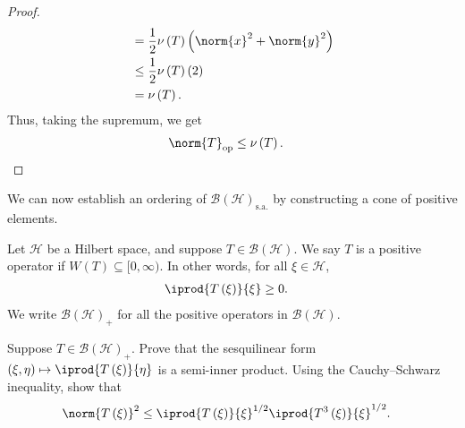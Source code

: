 \documentclass[10pt]{mypackage}
\newcommand{\sa}{\text{s.a.}}
\begin{document}
\begin{proof}
\begin{align*}
                                                      &= \frac{1}{2}\nu\left(T\right)\left(\norm{x}^2 + \norm{y}^2\right)\\
                                                      &\leq \frac{1}{2}\nu\left(T\right)\left(2\right)\\
                                                      &= \nu\left(T\right).
  \end{align*}
  Thus, taking the supremum, we get
  \begin{align*}
    \norm{T}_{\text{op}} &\leq \nu\left(T\right).
  \end{align*}
\end{proof}
We can now establish an ordering of $\mathcal{B}\left(\mathcal{H}\right)_{\sa}$ by constructing a cone of positive elements.
\begin{definition}
  Let $\mathcal{H}$ be a Hilbert space, and suppose $T\in \mathcal{B}\left(\mathcal{H}\right)$. We say $T$ is a positive operator if $W(T) \subseteq [0,\infty)$. In other words, for all $\xi\in \mathcal{H}$,
  \begin{align*}
    \iprod{T\left(\xi\right)}{\xi} &\geq 0.
  \end{align*}
  We write $\mathcal{B}\left(\mathcal{H}\right)_{+}$ for all the positive operators in $\mathcal{B}\left(\mathcal{H}\right)$.
\end{definition}
\begin{exercise}
  Suppose $T\in \mathcal{B}\left(\mathcal{H}\right)_{+}$. Prove that the sesquilinear form $\left(\xi,\eta\right)\mapsto \iprod{T\left(\xi\right)}{\eta}$ is a semi-inner product. Using the Cauchy--Schwarz inequality, show that
  \begin{align*}
    \norm{T\left(\xi\right)}^2 &\leq \iprod{T\left(\xi\right)}{\xi}^{1/2} \iprod{T^3\left(\xi\right)}{\xi}^{1/2}.
  \end{align*}
\end{exercise}
\end{document}
